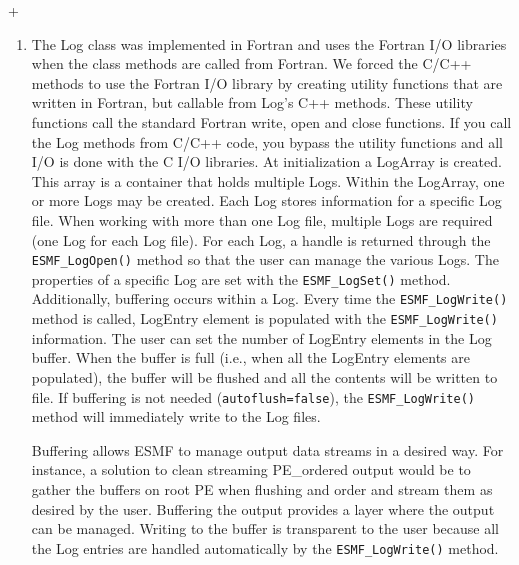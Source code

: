 +%
%
\begin{enumerate}
\item The Log class was implemented in Fortran and uses the Fortran I/O 
libraries when the class methods are called from Fortran. We forced the C/C++
methods to use the Fortran I/O library by creating utility functions that are
written in Fortran, but callable from Log's C++ methods.  These utility 
functions call the standard Fortran write, open and close functions.  If you
call the Log methods from C/C++ code, you bypass the utility functions and 
all I/O is done with the C I/O libraries.
At initialization a LogArray is created.  This array is a container that holds
multiple Logs.  Within the LogArray, one or more Logs may be created.  Each Log
stores information for a specific Log file.   When working with more than one 
Log file, multiple Logs are required (one Log for each Log file).  For each 
Log, a handle is returned through the {\tt ESMF\_LogOpen()} method so that the
user can manage the various Logs.  The properties of a specific Log are set 
with the {\tt ESMF\_LogSet()} method.  Additionally, buffering occurs within a
Log.  Every time the {\tt ESMF\_LogWrite()} method is called, LogEntry element
is populated with the {\tt ESMF\_LogWrite()} information.  The user can set the
number of LogEntry elements in the Log buffer.  When the buffer is full (i.e.,
when all the LogEntry elements are populated), the buffer will be flushed and
all the contents will be written to file.  If buffering is not needed 
({\tt autoflush=false}), the {\tt ESMF\_LogWrite()} method will immediately 
write to the Log files. 

Buffering allows ESMF to manage output data streams in a desired way.  For 
instance, a solution to clean streaming PE\_ordered output would be to gather
the buffers on root PE when flushing and order and stream them as desired by
the user.  Buffering the output provides a layer where the output can be
managed.  Writing to the buffer is transparent to the user because all the Log
entries are handled automatically by the {\tt ESMF\_LogWrite()} method. 
\end{enumerate}




